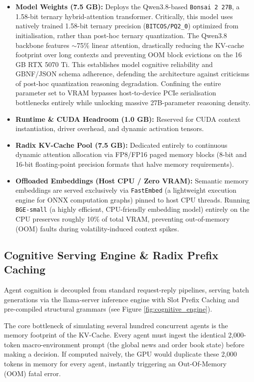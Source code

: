 \documentclass[10pt,a4paper]{article}
\begin{document}
\begin{itemize}
    \item \textbf{Model Weights (7.5 GB):} Deploys the Qwen3.8-based \texttt{Bonsai 2 27B}, a 1.58-bit ternary hybrid-attention transformer. Critically, this model uses natively trained 1.58-bit ternary precision (\texttt{BITCOS/PQ2\_0}) optimized from initialisation, rather than post-hoc ternary quantization. The Qwen3.8 backbone features $\sim$75\% linear attention, drastically reducing the KV-cache footprint over long contexts and preventing OOM block evictions on the 16 GB RTX 5070 Ti. This establishes model cognitive reliability and GBNF/JSON schema adherence, defending the architecture against criticisms of post-hoc quantization reasoning degradation. Confining the entire parameter set to VRAM bypasses host-to-device PCIe serialisation bottlenecks entirely while unlocking massive 27B-parameter reasoning density.
    \item \textbf{Runtime \& CUDA Headroom (1.0 GB):} Reserved for CUDA context instantiation, driver overhead, and dynamic activation tensors.
    \item \textbf{Radix KV-Cache Pool (7.5 GB):} Dedicated entirely to continuous dynamic attention allocation via FP8/FP16 paged memory blocks (8-bit and 16-bit floating-point precision formats that halve memory requirements).
    \item \textbf{Offloaded Embeddings (Host CPU / Zero VRAM):} Semantic memory embeddings are served exclusively via \texttt{FastEmbed} (a lightweight execution engine for ONNX computation graphs) pinned to host CPU threads. Running \texttt{BGE-small} (a highly efficient, CPU-friendly embedding model) entirely on the CPU preserves roughly 10\% of total VRAM, preventing out-of-memory (OOM) faults during volatility-induced context spikes.
\end{itemize}

\subsection{Cognitive Serving Engine \& Radix Prefix Caching}

Agent cognition is decoupled from standard request-reply pipelines, serving batch generations via the llama-server inference engine with Slot Prefix Caching and pre-compiled structural grammars (see Figure \ref{fig:cognitive_engine}).

The core bottleneck of simulating several hundred concurrent agents is the memory footprint of the KV-Cache. Every agent must ingest the identical 2,000-token macro-environment prompt (the global news and order book state) before making a decision. If computed naively, the GPU would duplicate these 2,000 tokens in memory for every agent, instantly triggering an Out-Of-Memory (OOM) fatal error.
\end{document}
